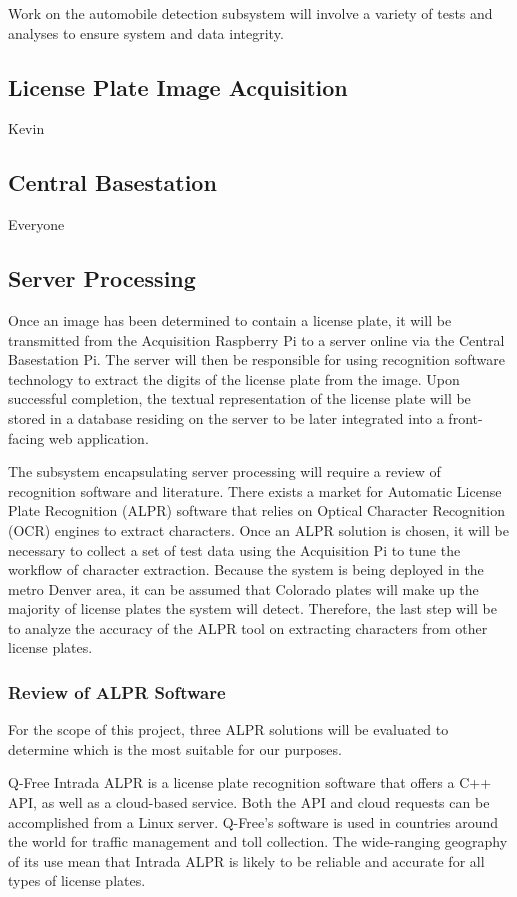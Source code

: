 \documentclass[11pt, oneside, fullpage, doublespace]{article}
\begin{document}
Work on the automobile detection subsystem will involve a variety of tests and analyses to ensure system and data integrity.


\subsection{License Plate Image Acquisition}
Kevin


\subsection{Central Basestation}
Everyone


\subsection{Server Processing}
Once an image has been determined to contain a license plate, it will be transmitted from the Acquisition Raspberry Pi to a server online via the Central Basestation Pi. The server will then be responsible for using recognition software technology to extract the digits of the license plate from the image. Upon successful completion, the textual representation of the license plate will be stored in a database residing on the server to be later integrated into a front-facing web application.

The subsystem encapsulating server processing will require a review of recognition software and literature. There exists a market for Automatic License Plate Recognition (ALPR) software that relies on Optical Character Recognition (OCR) engines to extract characters. Once an ALPR solution is chosen, it will be necessary to collect a set of test data using the Acquisition Pi to tune the workflow of character extraction. Because the system is being deployed in the metro Denver area, it can be assumed that Colorado plates will make up the majority of license plates the system will detect. Therefore, the last step will be to analyze the accuracy of the ALPR tool on extracting characters from other license plates.

\subsubsection{Review of ALPR Software}
For the scope of this project, three ALPR solutions will be evaluated to determine which is the most suitable for our purposes.

Q-Free Intrada ALPR is a license plate recognition software that offers a C++ API, as well as a cloud-based service. Both the API and cloud requests can be accomplished from a Linux server. Q-Free's software is used in countries around the world for traffic management and toll collection. The wide-ranging geography of its use mean that Intrada ALPR is likely to be reliable and accurate for all types of license plates.
\end{document}
